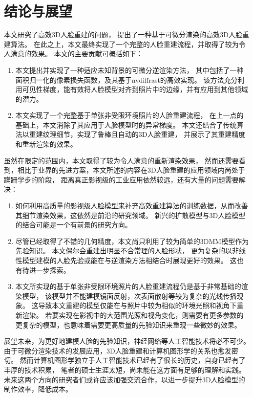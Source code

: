 \documentclass{scutmaster}
\begin{document}
{
\backmatter
\chapter{结论与展望}
\label{chap:conclusion}

本文研究了高效3D人脸重建的问题，
提出了一种基于可微分渲染的高效3D人脸重建算法。
在此之上，本文最终实现了一个完整的人脸重建流程，并取得了较为令人满意的效果。
本文的主要贡献可概括如下：
\begin{enumerate}
\item 本文提出并实现了一种适应未知背景的可微分逆渲染方法，
其中包括了一种面积归一化的像素损失函数，及其基于nvdiffrast的高效实现。
该方法充分利用可见性梯度，能有效将人脸模型对齐到照片中的边缘，并有应用到其他领域的潜力。
\item 本文实现了一个完整基于单张非受限环境照片的人脸重建流程，
在上一点的基础上，本文消除了其应用于人脸模型时的异常梯度。
本文还结合了传统算法以重建纹理细节，实现了鲁棒且自动的3D人脸重建，
并展示了其重建精度和重新渲染的效果。
\end{enumerate}

虽然在限定的范围内，本文取得了较为令人满意的重新渲染效果，
然而还需要看到，相比于业界的先进方案，本文所述的内容在3D人脸重建的应用领域内尚处于蹒跚学步的阶段，
距离真正影视级的工业应用依然较远，还有大量的问题需要解决：
\begin{enumerate}
\item 如何利用高质量的影视级人脸模型来补充高效重建算法的训练数据，从而改善其细节渲染效果，这依然是前沿的研究领域。
新兴的扩散模型与3D人脸模型的结合可能是一个有前景的研究方向。
\item 尽管已经取得了不错的几何精度，本文尚只利用了较为简单的3DMM模型作为先验知识。
本文偶尔会重建出明显不合常理的人脸形状，
更为复杂的以非线性模型建模的人脸先验或能在与逆渲染方法相结合时展现更好的效果。
这也有待进一步探索。
\item 本文所实现的基于单张非受限环境照片的人脸重建流程仍是基于非常基础的渲染模型，
该模型并不能建模镜面反射，次表面散射等较为复杂的光线传播现象。
这导致本文重建的模型仅能在与照片中较为相似的环境光照和视角下重新渲染。
若要实现在影视中的大范围光照和视角变化，则需要有更多参数的更复杂的模型，也意味着需要更高质量的先验知识来重现一些微妙的效果。
\end{enumerate}

展望未来，为更好地建模人脸的先验知识，神经网络等人工智能技术将必不可少。
由于可微分渲染技术的发展应用，3D人脸重建和计算机图形学的关系也愈发密切。
然而计算机图形学独立于人工智能技术已经有了很长的历史，自身已经有了丰厚的技术积累，
笔者的硕士生涯太短，尚未能在这方面有足够的理解和实践。
未来这两个方向的研究者们或许应该加强交流合作，以进一步提升3D人脸模型的制作效率，降低成本。

}
\end{document}
